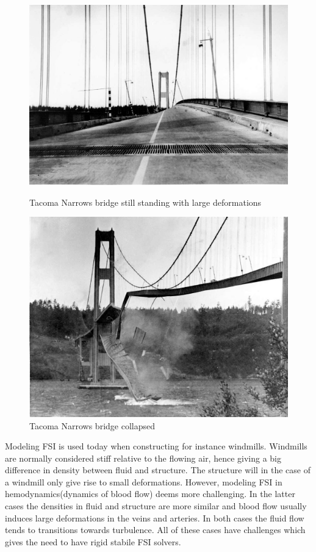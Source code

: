 \begin{figure}
\centering
\begin{minipage}{.51\textwidth}
  \centering
  \includegraphics[width=.95\linewidth]{./IntroductionToFSI/tacoma2.jpeg}
  \caption{Tacoma Narrows bridge still standing with large deformations}
  \label{fig:test1}
\end{minipage}%
\begin{minipage}{.50\textwidth}
  \centering
  \includegraphics[width=.95\linewidth]{./IntroductionToFSI/tacoma3.jpeg}
  \caption{Tacoma Narrows bridge collapsed}
  \label{fig:test2}
\end{minipage}
\end{figure}

Modeling FSI is used today when constructing for instance windmills. Windmills are normally considered stiff relative to the flowing air, hence giving a big difference in density between fluid and structure. The structure will in the case of a windmill only give rise to small deformations. However, modeling FSI in hemodynamics(dynamics of blood flow) deems more challenging. In the latter cases the densities in fluid and structure are more similar and blood flow usually induces large deformations in the veins and arteries. In both cases the fluid flow tends to transitions towards turbulence. All of these cases have challenges which gives the need to have rigid stabile FSI solvers. \newline


